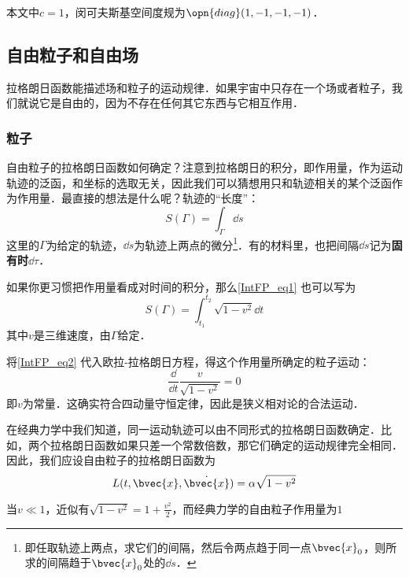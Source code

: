 

本文中$c=1$，闵可夫斯基空间度规为$\opn{diag}(1, -1, -1, -1)$．

\subsection{自由粒子和自由场}

拉格朗日函数能描述场和粒子的运动规律．如果宇宙中只存在一个场或者粒子，我们就说它是自由的，因为不存在任何其它东西与它相互作用．

\subsubsection{粒子}

自由粒子的拉格朗日函数如何确定？注意到拉格朗日的积分，即作用量，作为运动轨迹的泛函，和坐标的选取无关，因此我们可以猜想用只和轨迹相关的某个泛函作为作用量．最直接的想法是什么呢？轨迹的“长度”：
\begin{equation}\label{IntFP_eq1}
S(\Gamma) = \int_\Gamma \dd s
\end{equation}
这里的$\Gamma$为给定的轨迹，$\dd s$为轨迹上两点的微分\footnote{即任取轨迹上两点，求它们的间隔，然后令两点趋于同一点$\bvec{x}_0$，则所求的间隔趋于$\bvec{x}_0$处的$\dd s$．}．有的材料里，也把间隔$\dd s$记为\textbf{固有时}$\dd \tau$．

如果你更习惯把作用量看成对时间的积分，那么\autoref{IntFP_eq1} 也可以写为
\begin{equation}\label{IntFP_eq2}
S(\Gamma) = \int_{t_1}^{t_2} \sqrt{1-v^2} \dd t
\end{equation}
其中$v$是三维速度，由$\Gamma$给定．

将\autoref{IntFP_eq2} 代入欧拉-拉格朗日方程，得这个作用量所确定的粒子运动：
\begin{equation}
\frac{\dd}{\dd t}\frac{v}{\sqrt{1-v^2}} = 0
\end{equation}
即$v$为常量．这确实符合四动量守恒定律，因此是狭义相对论的合法运动．

在经典力学中我们知道，同一运动轨迹可以由不同形式的拉格朗日函数确定．比如，两个拉格朗日函数如果只差一个常数倍数，那它们确定的运动规律完全相同．因此，我们应设自由粒子的拉格朗日函数为
\begin{equation}
L(t, \bvec{x}, \dot{\bvec{x}}) = \alpha\sqrt{1-v^2}
\end{equation}

当$v\ll 1$，近似有$\sqrt{1-v^2}=1+\frac{v^2}{2}$，而经典力学的自由粒子作用量为$1$


















